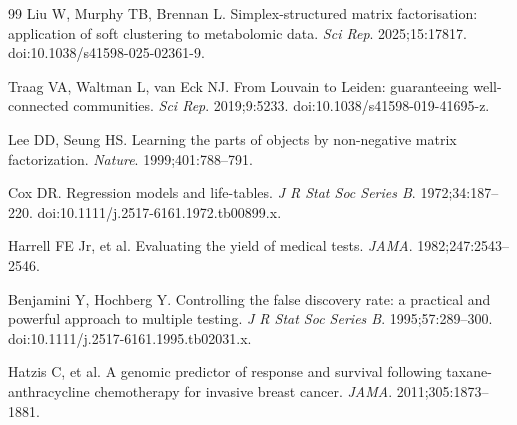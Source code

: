 \documentclass[11pt,a4paper]{article}
\begin{document}
\begin{thebibliography}{99}
Liu W, Murphy TB, Brennan L. Simplex-structured matrix factorisation: application of soft clustering to metabolomic data. \textit{Sci Rep}. 2025;15:17817. doi:10.1038/s41598-025-02361-9.

Traag VA, Waltman L, van Eck NJ. From Louvain to Leiden: guaranteeing well-connected communities. \textit{Sci Rep}. 2019;9:5233. doi:10.1038/s41598-019-41695-z.

Lee DD, Seung HS. Learning the parts of objects by non-negative matrix factorization. \textit{Nature}. 1999;401:788--791.

Cox DR. Regression models and life-tables. \textit{J R Stat Soc Series B}. 1972;34:187--220. doi:10.1111/j.2517-6161.1972.tb00899.x.

Harrell FE Jr, et al. Evaluating the yield of medical tests. \textit{JAMA}. 1982;247:2543--2546.

Benjamini Y, Hochberg Y. Controlling the false discovery rate: a practical and powerful approach to multiple testing. \textit{J R Stat Soc Series B}. 1995;57:289--300. doi:10.1111/j.2517-6161.1995.tb02031.x.

Hatzis C, et al. A genomic predictor of response and survival following taxane-anthracycline chemotherapy for invasive breast cancer. \textit{JAMA}. 2011;305:1873--1881.

\end{thebibliography}
\end{document}
